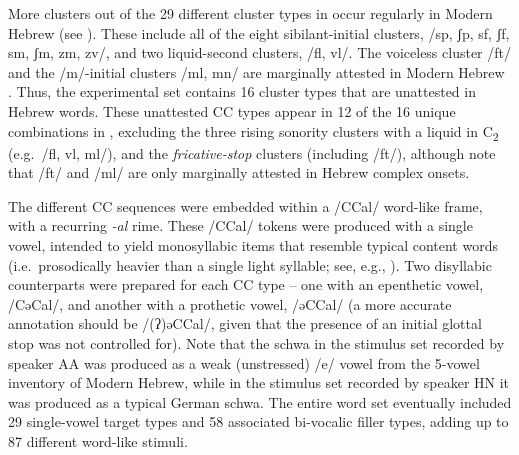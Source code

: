 More clusters out of the 29 different cluster types in  occur regularly in Modern Hebrew (see \citealt{asherov2019syllablesk}). These include all of the eight sibilant-initial clusters, /sp, ʃp, sf, ʃf, sm, ʃm, zm, zv/, and two liquid-second clusters, /fl, vl/. The voiceless cluster /ft/ and the /m/-initial clusters /ml, mn/ are marginally attested in Modern Hebrew \citep[75, 86]{asherov2019syllablesk}.
Thus, the experimental set contains 16 cluster types that are unattested in Hebrew words.
These unattested CC types appear in 12 of the 16 unique combinations in , excluding the three rising sonority clusters with a liquid in C\textsubscript{2} (e.g.~/fl, vl, ml/), and the \emph{fricative-stop} clusters (including /ft/), although note that /ft/ and /ml/ are only marginally attested in Hebrew complex onsets.


The different CC sequences were embedded within a /CCal/ word-like frame, with a recurring \emph{-al} rime. These /CCal/ tokens were produced with a single vowel, intended to yield monosyllabic items that resemble typical content words (i.e.~prosodically heavier than a single light syllable; see, e.g., \citealt{demuth1996prosodic}). Two disyllabic counterparts were prepared for each CC type -- one with an epenthetic vowel, /CəCal/, and another with a prothetic vowel, /əCCal/ (a more accurate annotation should be /(ʔ)əCCal/, given that the presence of an initial glottal stop was not controlled for).
Note that the schwa in the stimulus set recorded by speaker AA was produced as a weak (unstressed) /e/ vowel from the 5-vowel inventory of Modern Hebrew, while in the stimulus set recorded by speaker HN it was produced as a typical German schwa.
The entire word set eventually included 29 single-vowel target types and 58 associated bi-vocalic filler types, adding up to 87 different word-like stimuli.

